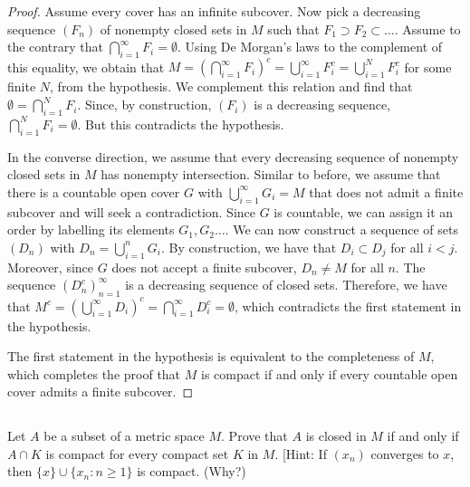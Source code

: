 \begin{proof}
Assume every cover has an infinite subcover. Now pick a decreasing sequence $(F_n)$ of nonempty closed sets in $M$ such that $F_1 \supset F_2 \subset \dots$. Assume to the contrary that $\bigcap_{i=1}^\infty F_i = \emptyset$. Using De Morgan's laws to the complement of this equality, we obtain that $M = (\bigcap_{i=1}^\infty F_i)^c = \bigcup_{i=1}^\infty F_i^c = \bigcup_{i=1}^N F_i^c$ for some finite $N$, from the hypothesis. We complement this relation and find that $\emptyset = \bigcap_{i=1}^N F_i$. Since, by construction, $(F_i)$ is a decreasing sequence, $\bigcap_{i=1}^N F_i = \emptyset$. But this contradicts the hypothesis.

\vspace{1em}

In the converse direction, we assume that every decreasing sequence of nonempty closed sets in $M$ has nonempty intersection. Similar to before, we assume that there is a countable open cover $G$ with $\bigcup_{i=1}^\infty G_i = M$ that does not admit a finite subcover and will seek a contradiction. Since $G$ is countable, we can assign it an order by labelling its elements $G_1, G_2 \dots$. We can now construct a sequence of sets $(D_n)$ with $D_n = \bigcup_{i=1}^n G_i$. By construction, we have that $D_i \subset D_j$ for all $i < j$. Moreover, since $G$ does not accept a finite subcover, $D_n \neq M$ for all $n$. The sequence $(D_n^c)_{n=1}^\infty$ is a decreasing sequence of closed sets. Therefore, we have that $M^c = (\bigcup_{i=1}^\infty D_i)^c = \bigcap_{i=1}^\infty D_i^c = \emptyset$, which contradicts the first statement in the hypothesis.

\vspace{1em}

The first statement in the hypothesis is equivalent to the completeness of $M$, which completes the proof that $M$ is compact if and only if every countable open cover admits a finite subcover.

\end{proof}




\subsection{} Let $A$ be a subset of a metric space $M$. Prove that $A$ is closed in $M$ if and only if $A \cap K$ is compact for every compact set $K$ in $M$. [Hint: If $(x_n)$ converges to $x$, then $\{x\} \cup \{x_n : n \geq 1\}$ is compact. (Why?)

